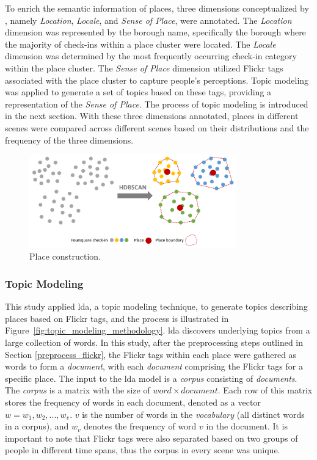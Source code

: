 \documentclass{article}
\theoremstyle{remark}
\begin{document}
To enrich the semantic information of places, three dimensions conceptualized by \cite{agnew_space_2011}, namely \textit{Location}, \textit{Locale}, and \textit{Sense of Place}, were annotated. The \textit{Location} dimension was represented by the borough name, specifically the borough where the majority of check-ins within a place cluster were located. The \textit{Locale} dimension was determined by the most frequently occurring check-in category within the place cluster. The \textit{Sense of Place} dimension utilized Flickr tags associated with the place cluster to capture people's perceptions. Topic modeling was applied to generate a set of topics based on these tags, providing a representation of the \textit{Sense of Place}. The process of topic modeling is introduced in the next section. With these three dimensions annotated, places in different scenes were compared across different scenes based on their distributions and the frequency of the three dimensions.

\begin{figure} [!h]
\centering
\includegraphics[width=0.8\textwidth]{figures/place_construction_methodology.png}
\caption{\label{fig:place_construction_methodology}Place construction.}
\end{figure}

\subsubsection{Topic Modeling}

This study applied \acrfull{lda}, a topic modeling technique, to generate topics describing places based on Flickr tags, and the process is illustrated in Figure~\ref{fig:topic_modeling_methodology}. \acrshort{lda} discovers underlying topics from a large collection of words. In this study, after the preprocessing steps outlined in Section \ref{preprocess_flickr}, the Flickr tags within each place were gathered as words to form a \textit{document}, with each \textit{document} comprising the Flickr tags for a specific place. The input to the \acrshort{lda} model is a \textit{corpus} consisting of \textit{documents}. The \textit{corpus} is a matrix with the size of $word \times document$. Each row of this matrix stores the frequency of words in each document, denoted as a vector $w = {w_{1}, w_{2}, ..., w_{v}}$. $v$ is the number of words in the \textit{vocabulary} (all distinct words in a corpus), and $w_{v}$ denotes the frequency of word $v$ in the document. It is important to note that Flickr tags were also separated based on two groups of people in different time spans, thus the corpus in every scene was unique.
\end{document}
